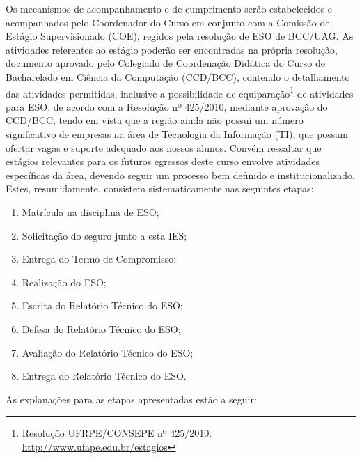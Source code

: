 \documentclass[
	12pt,				%
	openright,			%
  oneside,     %
	a4paper,			%
	chapter=TITLE,		%
	english,			%
	french,				%
	spanish,			%
	brazil				%
	]{abntex2}
\begin{document}
Os mecanismos de acompanhamento e de cumprimento serão estabelecidos e acompanhados pelo Coordenador do Curso em conjunto com a Comissão de Estágio Supervisionado (COE), regidos pela resolução de ESO de BCC/UAG. As atividades referentes ao estágio poderão ser encontradas na própria resolução, documento aprovado pelo Colegiado de Coordenação Didática do Curso de Bacharelado em Ciência da Computação (CCD/BCC), contendo o detalhamento das atividades permitidas, inclusive a possibilidade de equiparação\footnote{Resolução UFRPE/CONSEPE nº 425/2010: \url{http://www.ufape.edu.br/estagios}} de atividades para ESO, de acordo com a Resolução nº 425/2010, mediante aprovação do CCD/BCC, tendo em vista que a região ainda não possui um número significativo de empresas na área de Tecnologia da Informação (TI), que possam ofertar vagas e suporte adequado aos nossos alunos. Convém ressaltar que estágios relevantes para os futuros egressos deste curso envolve atividades específicas da área, devendo seguir um processo bem definido e institucionalizado. Estes, resumidamente, consistem sistematicamente nas seguintes etapas:

\begin{enumerate}
    \item Matrícula na disciplina de ESO;
    \item Solicitação do seguro junto a esta IES;
    \item Entrega do Termo de Compromisso;
    \item Realização do ESO;
    \item Escrita do Relatório Técnico do ESO;
    \item Defesa do Relatório Técnico do ESO;
    \item Avaliação do Relatório Técnico do ESO;
    \item Entrega do Relatório Técnico do ESO.
\end{enumerate}

As explanações para as etapas apresentadas estão a seguir:
\end{document}
